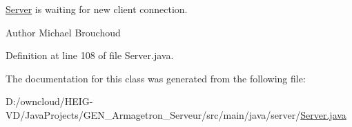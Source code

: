 \hyperlink{classserver_1_1_server}{Server} is waiting for new client connection. 

\begin{DoxyAuthor}{Author}
Michael Brouchoud 
\end{DoxyAuthor}


Definition at line 108 of file Server.\+java.



The documentation for this class was generated from the following file\+:\begin{DoxyCompactItemize}
\item 
D\+:/owncloud/\+H\+E\+I\+G-\/\+V\+D/\+Java\+Projects/\+G\+E\+N\+\_\+\+Armagetron\+\_\+\+Serveur/src/main/java/server/\hyperlink{_server_8java}{Server.\+java}\end{DoxyCompactItemize}
